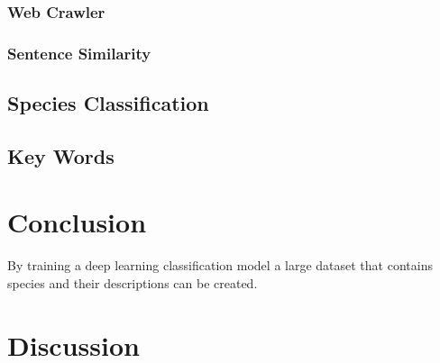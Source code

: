 \documentclass[a4paper, 12pt, oneside]{book} %
\begin{document}
\subsubsection{Web Crawler}

\subsubsection{Sentence Similarity}

\subsection{Species Classification}
\subsection{Key Words}

\section{Conclusion}
By training a deep learning classification model a large dataset that contains species and their descriptions can be created. 

\section{Discussion}

\printbibliography
\end{document}
